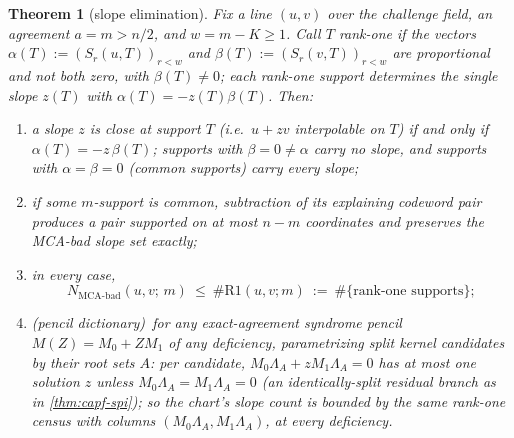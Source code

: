 \documentclass[11pt]{article}
\newtheorem{theorem}{Theorem}[section]
\theoremstyle{definition}
\theoremstyle{remark}
\begin{document}
\begin{theorem}[slope elimination]\label{thm:capfp-slope-elim}
Fix a line $(u,v)$ over the challenge field, an agreement $a=m>n/2$, and $w=m-K\ge1$.  Call $T$ \emph{rank-one} if the vectors $\alpha(T):=(S_r(u,T))_{r<w}$ and $\beta(T):=(S_r(v,T))_{r<w}$ are proportional and not both zero, with $\beta(T)\ne0$; each rank-one support determines the single slope $z(T)$ with $\alpha(T)=-z(T)\beta(T)$.  Then:
\begin{enumerate}[label=\textup{(\alph*)}]
\item a slope $z$ is close at support $T$ \textup(i.e.\ $u+zv$ interpolable on $T$\textup) if and only if $\alpha(T)=-z\,\beta(T)$; supports with $\beta=0\ne\alpha$ carry no slope, and supports with $\alpha=\beta=0$ \textup(\emph{common} supports\textup) carry every slope;
\item if some $m$-support is common, subtraction of its explaining codeword pair produces a pair supported on at most $n-m$ coordinates and preserves the MCA-bad slope set exactly;
\item in every case,
\[
        N_{\mathrm{MCA\text{-}bad}}(u,v;\,m)\ \le\ \#\mathrm{R1}(u,v;m)\ :=\ \#\{\text{rank-one supports}\};
\]
\item \textup(pencil dictionary\textup)\ for any exact-agreement syndrome pencil $M(Z)=M_0+ZM_1$ of \emph{any} deficiency, parametrizing split kernel candidates by their root sets $A$: per candidate, $M_0\Lambda_A+zM_1\Lambda_A=0$ has at most one solution $z$ unless $M_0\Lambda_A=M_1\Lambda_A=0$ \textup(an identically-split residual branch as in \cref{thm:capf-spi}\textup); so the chart's slope count is bounded by the same rank-one census with columns $(M_0\Lambda_A,M_1\Lambda_A)$, at every deficiency.
\end{enumerate}
\end{theorem}
\end{document}

